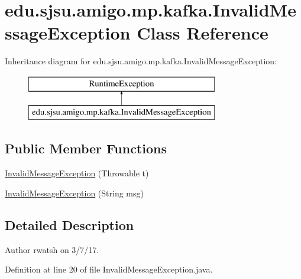 \hypertarget{classedu_1_1sjsu_1_1amigo_1_1mp_1_1kafka_1_1_invalid_message_exception}{}\section{edu.\+sjsu.\+amigo.\+mp.\+kafka.\+Invalid\+Message\+Exception Class Reference}
\label{classedu_1_1sjsu_1_1amigo_1_1mp_1_1kafka_1_1_invalid_message_exception}
Inheritance diagram for edu.\+sjsu.\+amigo.\+mp.\+kafka.\+Invalid\+Message\+Exception\+:\begin{figure}[H]
\begin{center}
\leavevmode
\includegraphics[height=2.000000cm]{classedu_1_1sjsu_1_1amigo_1_1mp_1_1kafka_1_1_invalid_message_exception}
\end{center}
\end{figure}
\subsection*{Public Member Functions}
\begin{DoxyCompactItemize}
\item 
\hyperlink{classedu_1_1sjsu_1_1amigo_1_1mp_1_1kafka_1_1_invalid_message_exception_a4d5e8025b40f8e8f752fe420a3670f34}{Invalid\+Message\+Exception} (Throwable t)
\item 
\hyperlink{classedu_1_1sjsu_1_1amigo_1_1mp_1_1kafka_1_1_invalid_message_exception_ab65c9baf360d88c7216e0d26f4071693}{Invalid\+Message\+Exception} (String msg)
\end{DoxyCompactItemize}


\subsection{Detailed Description}
\begin{DoxyAuthor}{Author}
rwatsh on 3/7/17. 
\end{DoxyAuthor}


Definition at line 20 of file Invalid\+Message\+Exception.\+java.



